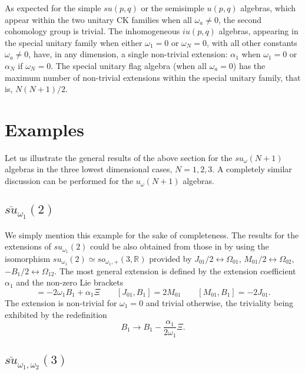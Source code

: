 \documentclass[12pt]{article}
\begin{document}
As expected for the simple
$su({p,q})$ or the semisimple $u({p,q})$ algebras, which appear within the
two unitary CK families when all
${\omega}_a\ne 0$, the second cohomology group is trivial. The inhomogeneous
$iu({p,q})$ algebras, appearing in the special unitary family when either
${\omega}_1=0$ or
${\omega}_N=0$, with all other constants ${\omega}_a
\neq 0$, have, in any dimension, a single non-trivial extension:
${\alpha}_{1}$ when ${\omega}_1=0$ or ${\alpha}_{N}$ if ${\omega}_N=0$.
The  special unitary flag algebra (when all ${\omega}_a= 0$) has the maximum
number of non-trivial extensions within the special unitary family, that
is, ${N(N+1)}/2$.

\section{Examples}
\label{sec.4}

Let us illustrate the general results of the above section for the
${su}_{\omega}(N+1)$ algebras in the three lowest dimensional cases,
$N=1,2,3$. A completely similar discussion can be performed for the
${u}_{\omega}(N+1)$ algebras.

\subsection{$\overline{su}_{{\omega}_1}(2)$ }

We simply mention this example for the sake of completeness. The
results for the extensions of ${su}_{{\omega}_1}(2)$ could be also obtained
from those in
\cite{Azc.Her.Bue.San:96}
by using the isomorphism ${su}_{{\omega}_1}(2) \simeq so_{{\omega}_1, +
}(3,
{{\mathbb R}})$ provided by
${J}_{01}/2 \leftrightarrow \Omega_{01}$,
${M}_{01}/2 \leftrightarrow \Omega_{02}$,
$-{B}_{1}/2 \leftrightarrow \Omega_{12}$.
The most general extension is defined
by the extension coefficient ${\alpha}_{1}$
and the non-zero Lie brackets
\begin{equation}
[{J}_{01},{M}_{01}] =-2{\omega}_1{B}_1+{\alpha}_{1}\Xi  \qquad
[{J}_{01},{B}_{1}] =2{M}_{01}  \qquad
[{M}_{01},{B}_{1}] =-2{J}_{01}.
\end{equation}
The extension is non-trivial for ${\omega}_1 = 0$ and trivial otherwise, the
triviality being exhibited by the redefinition
\begin{equation}
{B}_1 \to {B}_1 - \frac{{\alpha}_{1}}{2{\omega}_1} \Xi .
\end{equation}

\subsection{$\overline{su}_{{\omega}_1,{\omega}_2}(3)$ }
\end{document}
